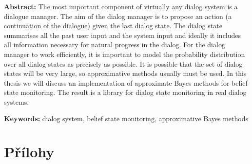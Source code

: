 \documentclass[12pt,a4paper]{report}
\let\openright=\clearpage
\def\chapwithtoc#1{
\chapter*{#1}
\addcontentsline{toc}{chapter}{#1}
}
\begin{document}
{\textbf{Abstract:}
The most important component of virtually any dialog system is a dialogue manager.
The aim of the dialog manager is to propose an action (a continuation of the dialogue) given the last dialog state.
The dialog state summarises all the past user input and the system input and ideally it includes all information necessary for natural progress in the dialog.
For the dialog manager to work efficiently, it is important to model the probability distribution over all dialog states as precisely as possible.
It is possible that the set of dialog states will be very large, so approximative methods usually must be used.
In this thesis we will discuss an implementation of approximate Bayes methods for belief state monitoring.
The result is a library for dialog state monitoring in real dialog systems.

\textbf{Keywords:} dialog system, belief state monitoring, approximative Bayes methods

\vss}

\newpage


\openright
\pagestyle{plain}
\setcounter{page}{1}
\tableofcontents

\onehalfspacing









\appendix



\singlespacing

{}




\chapwithtoc{Přílohy}

\openright
\end{document}
